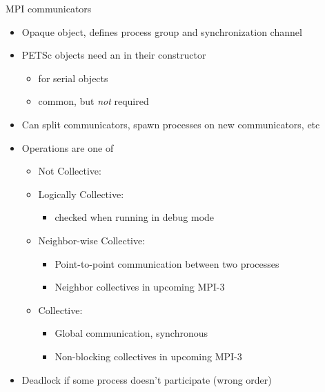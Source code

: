 

\begin{frame}{MPI communicators}
  \begin{itemize}
  \item Opaque object, defines process group and synchronization channel
  \item PETSc objects need an  in their constructor
    \begin{itemize}
    \item {} for serial objects
    \item {} common, but \emph{not} required
    \end{itemize}
  \item Can split communicators, spawn processes on new communicators, etc
  \item Operations are one of
    \begin{itemize}
    \item Not Collective: 
    \item Logically Collective: 
      \begin{itemize}
      \item checked when running in debug mode
      \end{itemize}
    \item Neighbor-wise Collective: 
      \begin{itemize}
      \item Point-to-point communication between two processes
      \item Neighbor collectives in upcoming MPI-3
      \end{itemize}
    \item Collective: 
      \begin{itemize}
      \item Global communication, synchronous
      \item Non-blocking collectives in upcoming MPI-3
      \end{itemize}
    \end{itemize}
  \item Deadlock if some process doesn't participate (\eg wrong order)
  \end{itemize}
\end{frame}


